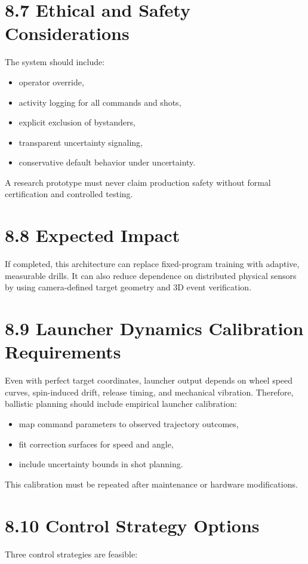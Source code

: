 \section{8.7 Ethical and Safety Considerations}
The system should include:
\begin{itemize}
  \item operator override,
  \item activity logging for all commands and shots,
  \item explicit exclusion of bystanders,
  \item transparent uncertainty signaling,
  \item conservative default behavior under uncertainty.
\end{itemize}

A research prototype must never claim production safety without formal certification and controlled testing.

\section{8.8 Expected Impact}
If completed, this architecture can replace fixed-program training with adaptive, measurable drills. It can also reduce dependence on distributed physical sensors by using camera-defined target geometry and 3D event verification.


\section{8.9 Launcher Dynamics Calibration Requirements}
Even with perfect target coordinates, launcher output depends on wheel speed curves, spin-induced drift, release timing, and mechanical vibration. Therefore, ballistic planning should include empirical launcher calibration:
\begin{itemize}
  \item map command parameters to observed trajectory outcomes,
  \item fit correction surfaces for speed and angle,
  \item include uncertainty bounds in shot planning.
\end{itemize}

This calibration must be repeated after maintenance or hardware modifications.

\section{8.10 Control Strategy Options}
Three control strategies are feasible:


